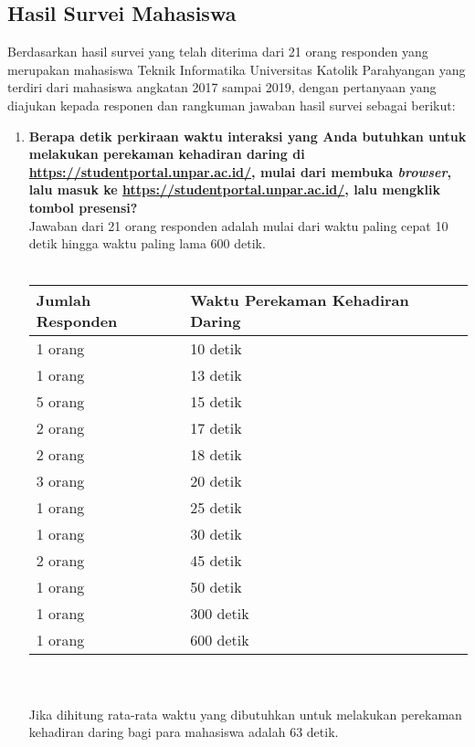 \documentclass[a4paper,twoside]{article}
\begin{document}
\begin{enumerate}
		\subsection{Hasil Survei Mahasiswa}
		Berdasarkan hasil survei yang telah diterima dari 21 orang responden yang merupakan mahasiswa Teknik Informatika Universitas Katolik
		Parahyangan yang terdiri dari mahasiswa angkatan 2017 sampai 2019, dengan pertanyaan yang diajukan kepada responen dan rangkuman jawaban hasil survei sebagai berikut:
		\begin{enumerate}
			\item \textbf{Berapa detik perkiraan waktu interaksi yang Anda butuhkan untuk melakukan perekaman kehadiran daring di \url{https://studentportal.unpar.ac.id/}, mulai dari membuka \textit{browser}, lalu masuk ke \url{https://studentportal.unpar.ac.id/}, lalu mengklik tombol presensi?}\\
				Jawaban dari 21 orang responden adalah mulai dari waktu paling cepat 10 detik hingga waktu paling lama 600 detik.\\ \\
			\begin{tabular}{|p{4cm} |p{7cm}|}
				\hline
				Jumlah Responden &  Waktu Perekaman Kehadiran Daring \\ \hline     
				1 orang &  10 detik\\ \hline 
				1 orang &  13 detik\\ \hline 
				5 orang &  15 detik\\ \hline 
				2 orang &  17 detik\\ \hline 
				2 orang &  18 detik\\ \hline 
				3 orang &  20 detik\\ \hline
				1 orang &  25 detik\\ \hline 
				1 orang &  30 detik\\ \hline 
				2 orang &  45 detik\\ \hline
				1 orang &  50 detik\\ \hline 
				1 orang &  300 detik\\ \hline 
				1 orang &  600 detik\\ \hline
			\end{tabular}\\ \\
			Jika dihitung rata-rata waktu yang dibutuhkan untuk melakukan perekaman kehadiran daring bagi para mahasiswa adalah 63 detik.
			

\end{enumerate}
\end{enumerate}
\end{document}
